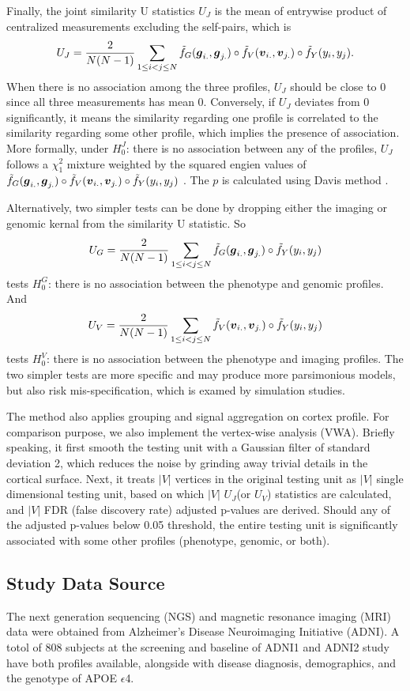 {Finally, the joint similarity U statistics $U_J$ is the mean of entrywise product of centralized measurements excluding the self-pairs, which is
\[ U_J = \frac{2}{N(N-1)} \sum_{1 \leq i < j \leq N}^{} \tilde{f}_G(\boldsymbol{g}_{i.}, \boldsymbol{g}_{j.}) \circ \tilde{f}_V(\boldsymbol{v}_{i.}, \boldsymbol{v}_{j.}) \circ \tilde{f}_Y(y_i, y_j). \]
When there is no association among the three profiles, $U_J$ should be close to $0$ since all three measurements has mean $0$. Conversely, if $U_J$ deviates from $0$ significantly, it means the similarity regarding one profile is correlated to the similarity regarding some other profile, which implies the presence of association. More formally, under $H_0^J$: there is no association between any of the profiles, $U_J$ follows a $\chi_1^2$ mixture weighted by the squared engien values of $\tilde{f}_G(\boldsymbol{g}_{i.}, \boldsymbol{g}_{j.}) \circ \tilde{f}_V(\boldsymbol{v}_{i.}, \boldsymbol{v}_{j.}) \circ \tilde{f}_Y(y_i, y_j)$ \cite{UST1, UST2}. The $p$ is calculated using Davis method \cite{davies80}.

Alternatively, two simpler tests can be done by dropping either the imaging or genomic kernal from the similarity U statistic. So
\[ U_G = \frac{2}{N(N-1)} \sum_{1 \leq i < j \leq N}^{} \tilde{f}_G(\boldsymbol{g}_{i.}, \boldsymbol{g}_{j.}) \circ \tilde{f}_Y(y_i, y_j) \]
tests $H_0^G$: there is no association between the phenotype and genomic profiles. And
\[ U_V = \frac{2}{N(N-1)} \sum_{1 \leq i < j \leq N}^{} \tilde{f}_V(\boldsymbol{v}_{i.}, \boldsymbol{v}_{j.}) \circ \tilde{f}_Y(y_i, y_j) \]
tests $H_0^V$: there is no association between the phenotype and imaging profiles. The two simpler tests are more specific and may produce more parsimonious models, but also risk mis-specification, which is examed by simulation studies.

The method also applies grouping and signal aggregation on cortex profile. For comparison purpose, we also implement the vertex-wise analysis (VWA). Briefly speaking, it first smooth the testing unit with a Gaussian filter of standard deviation 2, which reduces the noise by grinding away trivial details in the cortical surface. Next, it treats $|V|$ vertices in the original testing unit as $|V|$ single dimensional testing unit, based on which $|V|$ $U_J$(or $U_V$) statistics are calculated, and $|V|$ FDR (false discovery rate) adjusted p-values are derived. Should any of the adjusted p-values below 0.05 threshold, the entire testing unit is significantly associated with some other profiles (phenotype, genomic, or both).

\subsection{Study Data Source}
The next generation sequencing (NGS) and magnetic resonance imaging (MRI) data were obtained from Alzheimer’s Disease Neuroimaging Initiative (ADNI). A totol of 808 subjects at the screening and baseline of ADNI1 and ADNI2 study have both profiles available, alongside with disease diagnosis, demographics, and the genotype of APOE $\epsilon$4. 

}
